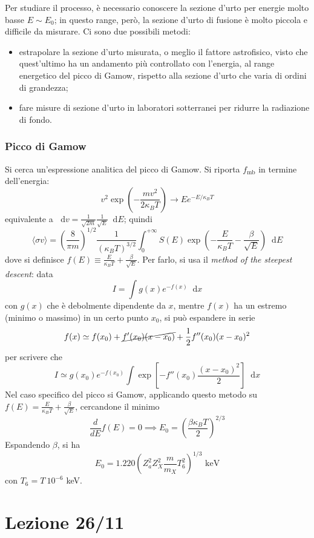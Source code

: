 \documentclass[11pt, a4paper]{scrartcl}
\theoremstyle{style}
\newcommand{\dd}{\mathop{}\!\mathrm{d}}
\numberwithin{equation}{subsection}
\begin{document}
Per studiare il processo, \`e necessario conoscere la sezione d'urto per energie molto basse $E \sim E_0$; in questo range, per\`o, la sezione d'urto di fusione \`e molto piccola e difficile da misurare. 
Ci sono due possibili metodi:
\begin{itemize}
	\item estrapolare la sezione d'urto misurata, o meglio il fattore astrofisico, visto che quest'ultimo ha un andamento pi\`u controllato con l'energia, al range energetico del picco di Gamow, rispetto alla sezione d'urto che varia di ordini di grandezza;
	\item fare misure di sezione d'urto in laboratori sotterranei per ridurre la radiazione di fondo.
\end{itemize}

\subsubsection{Picco di Gamow}

Si cerca un'espressione analitica del picco di Gamow.
Si riporta $f_\text{mb}$ in termine dell'energia: 
\[
v^2 \exp \left(- \frac{mv^2}{2\kappa _B T }\right)  \to E e^{- E / \kappa _ BT }
\] 
equivalente a $\dd v = \frac{1}{\sqrt{2m} }\frac{1}{\sqrt{E} } \dd E$; quindi
\[
\langle \sigma  v \rangle = \left(\frac{8}{\pi m}\right)  ^{ 1 / 2} \frac{1}{\left(\kappa _B T \right) ^{3 / 2}} \int _0^{+\infty} S(E) \exp\left( - \frac{E}{\kappa _B T } - \frac{\beta }{\sqrt{E} }\right)  \dd E
\] 
dove si definisce $f(E) \equiv \frac{E}{\kappa _B T } + \frac{\beta }{\sqrt{E} }$.
Per farlo, si usa il \textit{method of the steepest descent}: data
\[
I = \int g(x) e^{-f(x)} \dd x
\] 
con $g(x)$ che \`e debolmente dipendente da $x$, mentre $f(x)$ ha un estremo (minimo o massimo) in un certo punto $x_0$, si pu\`o espandere in serie
\[
	f(x) \simeq f(x_0) + \cancel{f'(x_0) (x-x_0)} + \frac{1}{2} f''(x_0) (x-x_0)^2
\] 
per scrivere che 
\[
I \simeq g(x_0) e^{-f(x_0)} \int \exp \left[ - f''(x_0) \frac{(x-x_0)^2}{2} \right] \dd x
\] 
Nel caso specifico del picco si Gamow, applicando questo metodo su $f(E) = \frac{E}{\kappa _B T } + \frac{\beta }{\sqrt{E} }$, cercandone il minimo 
\[
\frac{d }{d E} f(E) = 0 \implies E_0 = \left(\frac{\beta \kappa _B T}{2}\right) ^{2 / 3}
\] 
Espandendo $\beta $, si ha
\[
E_0 = 1.220\left(Z_a^2 Z_X^2 \frac{m}{m_X} T_6^2\right) ^{1 / 3} \text{ keV}
\] 
con $T_6 = T ~ 10^{-6}$ keV.

\newpage


\section{Lezione 26/11}
\end{document}
